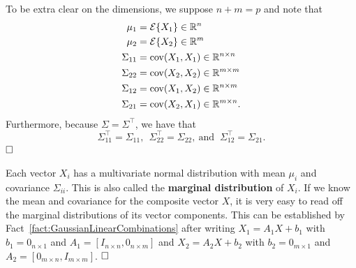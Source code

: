 \begin{rem}
To be extra clear on the dimensions, we suppose $n+m=p$ and note that
\begin{align*}
\mu_1 &=  \mathcal{E}\{ X_1\} \in \mathbb R^n \\
\mu_2 &=  \mathcal{E}\{ X_2\} \in \mathbb R^m \\
\Sigma_{11} &= \mathrm{cov}(X_1,X_1)   \in \mathbb R^{n \times n}\\
\Sigma_{22} &=\mathrm{cov}(X_2,X_2)  \in \mathbb R^{m \times m}\\
\Sigma_{12} &= \mathrm{cov}(X_1,X_2)   \in \mathbb R^{n \times m} \\
\Sigma_{21} &=\mathrm{cov}(X_2,X_1) \in \mathbb R^{m \times n}.
\end{align*}
Furthermore, because $\Sigma=\Sigma^\top$, we have that
$$\Sigma_{11}^\top = \Sigma_{11},~~\Sigma_{22}^\top = \Sigma_{22},~\text{and } ~\Sigma_{12}^\top = \Sigma_{21}.$$
$\hfill \square$  \end{rem}

\begin{fact} Each vector  $X_i$ has a multivariate normal distribution with mean $\mu_i$ and covariance $\Sigma_{ii}$. This is also called the \textbf{marginal distribution} of $X_i$. If we know the mean and covariance for the composite vector $X$, it is very easy to read off the marginal distributions of its vector components. This can be established by Fact~\ref{fact:GaussianLinearCombinations} after writing $X_1= A_1 X + b_1$ with $b_1=0_{n \times 1}$ and $A_1 = [I_{n \times n}, 0_{n \times m}]$ and $X_2= A_2 X + b_2$ with $b_2=0_{m \times 1}$ and $A_2 = [0_{m \times n}, I_{m \times m}]$.
$\hfill \square$  \end{fact}




